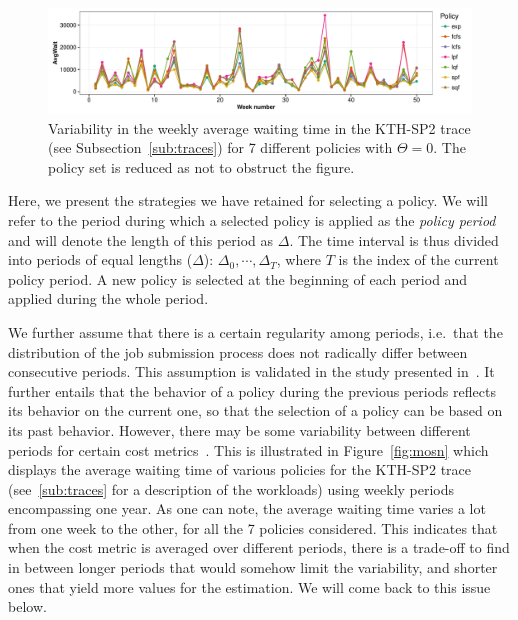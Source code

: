 \documentclass[sigconf,anonymous]{acmart}
\begin{document}
\begin{figure}[]
  \centering
  \includegraphics[scale=0.6]{figures/variability.pdf}

  \caption{Variability in the weekly average waiting time in the KTH-SP2 trace
  (see Subsection~\ref{sub:traces}) for 7 different policies with $\Theta = 0$. The policy set is
  reduced as not to obstruct the figure.}

  \label{fig:variability}
\end{figure}

Here, we present the strategies we have retained for selecting a policy. We will
refer to the period during which a selected policy is applied as the
\textit{policy period} and will denote the length of this period as $\Delta$.
The time interval is thus divided into periods of equal lengths ($\Delta$):
$\Delta_0, \cdots, \Delta_T$, where $T$ is the index of the current policy
period. A new policy is selected at the beginning of each period and applied
during the whole period.

We further assume that there is a certain regularity among periods, i.e.\ that
the distribution of the job submission process does not radically differ
between consecutive periods. This assumption is validated in the study
presented in~\cite{jsspp17}. It further entails that the behavior of a policy
during the previous periods reflects its behavior on the current one, so that
the selection of a policy can be based on its past behavior. However, there may
be some variability between different periods for certain cost
metrics~\cite{feitelson2001metrics}. This is illustrated in
Figure~\ref{fig:mosn} which displays the average waiting time of various
policies for the KTH-SP2 trace (see~\ref{sub:traces} for a description of the
workloads) using weekly periods encompassing one year. As one can note, the
average waiting time varies a lot from one week to the other, for all the 7
policies considered. This indicates that when the cost metric is averaged
over different periods, there is a trade-off to find in between longer periods
that would somehow limit the variability, and shorter ones that yield more
values for the estimation. We will come back to this issue below.
\end{document}
